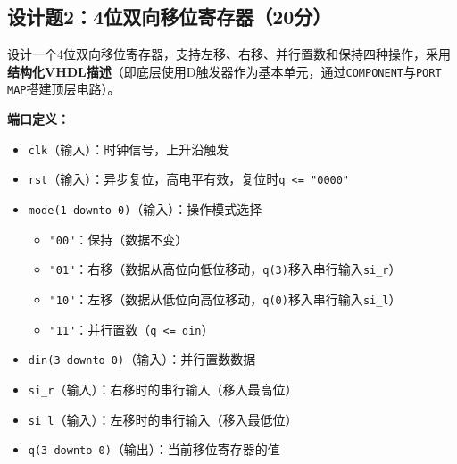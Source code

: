 \newpage

\subsection*{设计题2：4位双向移位寄存器（20分）}

设计一个4位双向移位寄存器，支持左移、右移、并行置数和保持四种操作，采用\textbf{结构化VHDL描述}（即底层使用D触发器作为基本单元，通过\texttt{COMPONENT}与\texttt{PORT MAP}搭建顶层电路）。

\vspace{0.3cm}

\textbf{端口定义：}
\begin{itemize}
  \item \texttt{clk}（输入）：时钟信号，上升沿触发
  \item \texttt{rst}（输入）：异步复位，高电平有效，复位时\texttt{q <= "0000"}
  \item \texttt{mode(1 downto 0)}（输入）：操作模式选择
  \begin{itemize}
    \item \texttt{"00"}：保持（数据不变）
    \item \texttt{"01"}：右移（数据从高位向低位移动，\texttt{q(3)}移入串行输入\texttt{si\_r}）
    \item \texttt{"10"}：左移（数据从低位向高位移动，\texttt{q(0)}移入串行输入\texttt{si\_l}）
    \item \texttt{"11"}：并行置数（\texttt{q <= din}）
  \end{itemize}
  \item \texttt{din(3 downto 0)}（输入）：并行置数数据
  \item \texttt{si\_r}（输入）：右移时的串行输入（移入最高位）
  \item \texttt{si\_l}（输入）：左移时的串行输入（移入最低位）
  \item \texttt{q(3 downto 0)}（输出）：当前移位寄存器的值
\end{itemize}

\vspace{0.3cm}

